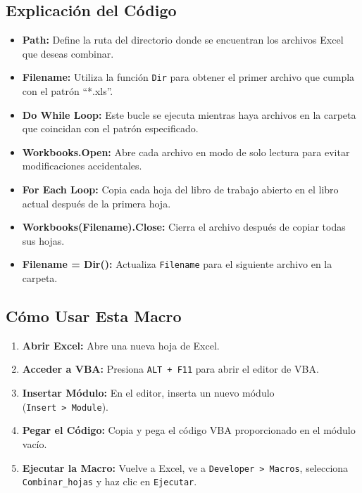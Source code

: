 \documentclass[
  jou,
  floatsintext,
  longtable,
  a4paper,
  nolmodern,
  notxfonts,
  notimes,
  colorlinks=true,linkcolor=blue,citecolor=blue,urlcolor=blue]{apa7}
\providecommand{\tightlist}{%
  \setlength{\itemsep}{0pt}\setlength{\parskip}{0pt}}
\begin{document}
\subsection{Explicación del Código}\label{explicaciuxf3n-del-cuxf3digo}

\begin{itemize}
\tightlist
\item
  \textbf{Path:} Define la ruta del directorio donde se encuentran los
  archivos Excel que deseas combinar.
\item
  \textbf{Filename:} Utiliza la función \texttt{Dir} para obtener el
  primer archivo que cumpla con el patrón ``*.xls''.
\item
  \textbf{Do While Loop:} Este bucle se ejecuta mientras haya archivos
  en la carpeta que coincidan con el patrón especificado.
\item
  \textbf{Workbooks.Open:} Abre cada archivo en modo de solo lectura
  para evitar modificaciones accidentales.
\item
  \textbf{For Each Loop:} Copia cada hoja del libro de trabajo abierto
  en el libro actual después de la primera hoja.
\item
  \textbf{Workbooks(Filename).Close:} Cierra el archivo después de
  copiar todas sus hojas.
\item
  \textbf{Filename = Dir():} Actualiza \texttt{Filename} para el
  siguiente archivo en la carpeta.
\end{itemize}

\subsection{Cómo Usar Esta Macro}\label{cuxf3mo-usar-esta-macro}

\begin{enumerate}
\def\labelenumi{\arabic{enumi}.}
\tightlist
\item
  \textbf{Abrir Excel:} Abre una nueva hoja de Excel.
\item
  \textbf{Acceder a VBA:} Presiona \texttt{ALT\ +\ F11} para abrir el
  editor de VBA.
\item
  \textbf{Insertar Módulo:} En el editor, inserta un nuevo módulo
  (\texttt{Insert\ \textgreater{}\ Module}).
\item
  \textbf{Pegar el Código:} Copia y pega el código VBA proporcionado en
  el módulo vacío.
\item
  \textbf{Ejecutar la Macro:} Vuelve a Excel, ve a
  \texttt{Developer\ \textgreater{}\ Macros}, selecciona
  \texttt{Combinar\_hojas} y haz clic en \texttt{Ejecutar}.
\end{enumerate}
\end{document}
